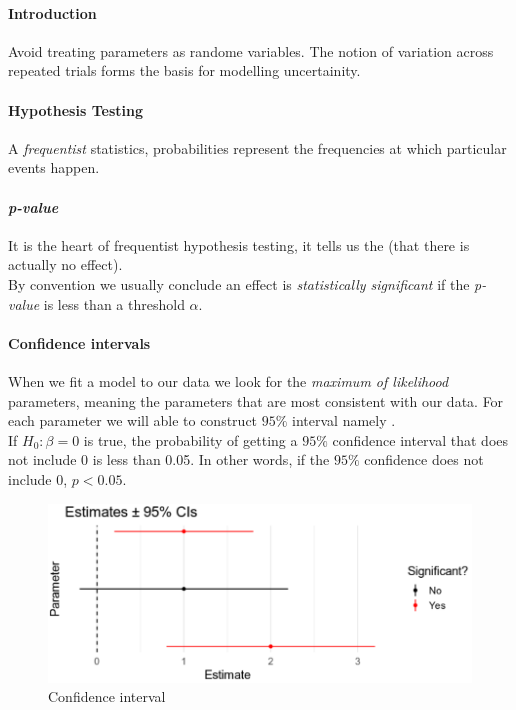 \paragraph{Introduction}
Avoid treating parameters as randome variables.
The notion of variation across repeated trials forms the basis for modelling
uncertainity.


\paragraph{Hypothesis Testing}
A \emph{frequentist} statistics, probabilities represent the frequencies at which 
particular events happen.

\paragraph{\emph{p-value}}
It is the heart of frequentist hypothesis testing, it tells us the  (that there is actually no effect).\\
By convention we usually conclude an effect is \emph{statistically significant} if the 
\emph{p-value} is less than a threshold $\alpha$.

\paragraph{Confidence intervals}
When we fit a model to our data we look for the \emph{maximum of likelihood} parameters,
meaning the parameters that are most consistent with our data. 
For each parameter we will able to construct $95\%$ interval namely .\\
If $H_{0}: \beta=0$ is true, the probability of getting a $95\%$ confidence interval that
does not include 0 is less than 0.05. In other words, if the $95\%$ confidence does not 
include 0, $p<0.05$.
\begin{figure}[H]
	\begin{center}
		\includegraphics[width=\textwidth]{./chapters/2_statistics/04_frequentist_approach/4_images/1_estimates.png}
	\end{center}
	\caption{Confidence interval}
	\label{fig:2.4.1_estimates}
\end{figure}

